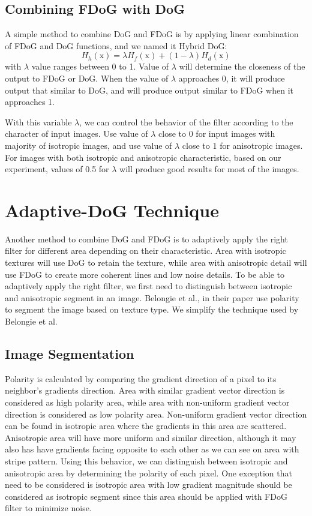 \subsection{Combining FDoG with DoG}
A simple method to combine DoG and FDoG is by applying linear combination of FDoG and DoG functions, and we named it Hybrid DoG:
\begin{equation}
	H_{h}(\mbox{x}) = \lambda H_{f}(\mbox{x}) + (1 - \lambda) H_{d}(\mbox{x})
\end{equation}
with $\lambda$ value ranges between 0 to 1. Value of $\lambda$ will determine the closeness of the output to FDoG or DoG. When the value of $\lambda$ approaches 0, it will produce output that similar to DoG, and will produce output similar to FDoG when it approaches 1. 

With this variable $\lambda$, we can control the behavior of the filter according to the character of input images. Use value of $\lambda$ close to 0 for input images with majority of isotropic images, and use value of $\lambda$ close to 1 for anisotropic images. For images with both isotropic and anisotropic characteristic, based on our experiment, values of 0.5 for $\lambda$ will produce good results for most of the images.

\section{Adaptive-DoG Technique}
Another method to combine DoG and FDoG is to adaptively apply the right filter for different area depending on their characteristic. Area with isotropic textures will use DoG to retain the texture, while area with anisotropic detail will use FDoG to create more coherent lines and low noise details. To be able to adaptively apply the right filter, we first need to distinguish between isotropic and anisotropic segment in an image. Belongie et al., \cite{belongie98} in their paper use polarity to segment the image based on texture type. We simplify the technique used by Belongie et al.

\subsection{Image Segmentation} 
Polarity is calculated by comparing the gradient direction of a pixel to its neighbor's gradients direction. Area with similar gradient vector direction is considered as high polarity area, while area with non-uniform gradient vector direction is considered as low polarity area. Non-uniform gradient vector direction can be found in isotropic area where the gradients in this area are scattered. Anisotropic area will have more uniform and similar direction, although it may also has have gradients facing opposite to each other as we can see on area with stripe pattern. Using this behavior, we can distinguish between isotropic and anisotropic area by determining the polarity of each pixel. One exception that need to be considered is isotropic area with low gradient magnitude should be considered as isotropic segment since this area should be applied with FDoG filter to minimize noise.

